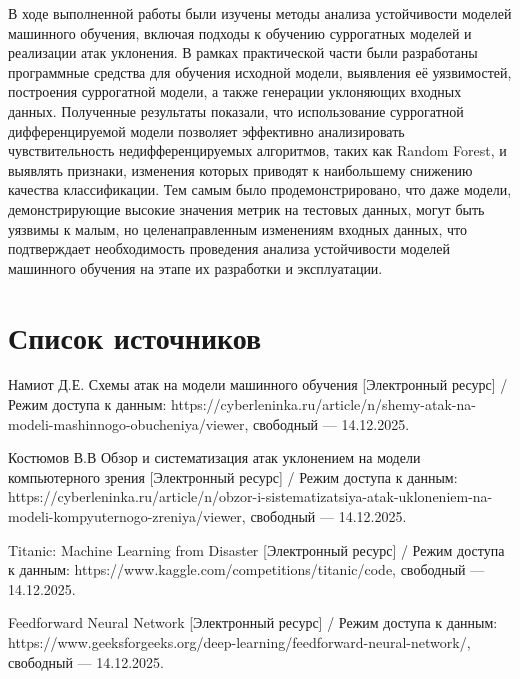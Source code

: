 \documentclass[14pt,a4paper]{extarticle}
\begin{document}
В ходе выполненной работы были изучены методы анализа устойчивости моделей
машинного обучения, включая подходы к обучению суррогатных моделей и реализации
атак уклонения. В рамках практической части были разработаны программные
средства для обучения исходной модели, выявления её уязвимостей, построения
суррогатной модели, а также генерации уклоняющих входных данных. Полученные
результаты показали, что использование суррогатной дифференцируемой модели
позволяет эффективно анализировать чувствительность недифференцируемых
алгоритмов, таких как Random Forest, и выявлять признаки, изменения которых
приводят к наибольшему снижению качества классификации. Тем самым было
продемонстрировано, что даже модели, демонстрирующие высокие значения метрик на
тестовых данных, могут быть уязвимы к малым, но целенаправленным изменениям
входных данных, что подтверждает необходимость проведения анализа устойчивости
моделей машинного обучения на этапе их разработки и эксплуатации.

\newpage
\section{Список источников}

\begin{enumerate}
        \begin{sloppypar}
        \item Намиот Д.Е. Схемы атак на модели машинного обучения
            [Электронный ресурс] /
            Режим доступа к данным:
            https://cyberleninka.ru/article/n/shemy-atak-na-modeli-mashinnogo-obucheniya/viewer,
            свободный — 14.12.2025.

        \item Костюмов В.В Обзор и систематизация атак уклонением
            на модели компьютерного зрения [Электронный ресурс] /
            Режим доступа к данным:
            https://cyberleninka.ru/article/n/obzor-i-sistematizatsiya-atak-ukloneniem-na-modeli-kompyuternogo-zreniya/viewer,
            свободный — 14.12.2025.
        \item Titanic: Machine Learning from Disaster [Электронный ресурс] /
            Режим доступа к данным: https://www.kaggle.com/competitions/titanic/code,
            свободный — 14.12.2025.

        \item Feedforward Neural Network [Электронный ресурс] /
            Режим доступа к данным: https://www.geeksforgeeks.org/deep-learning/feedforward-neural-network/,
            свободный — 14.12.2025.
        \end{sloppypar}
\end{enumerate}
\end{document}
